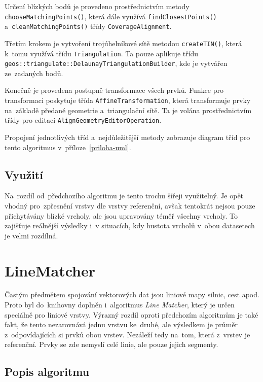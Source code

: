 Určení blízkých bodů je provedeno prostřednictvím metody 
\texttt{choose\-Matching\-Points()}, která dále využívá
\texttt{find\-Closest\-Points()} a~\texttt{clean\-Matching\-Points()} 
třídy \texttt{Coverage\-Alignment}.

Třetím krokem je vytvoření trojúhelníkové sítě metodou
\texttt{create\-TIN()}, která k~tomu využívá třídu 
\texttt{Tri\-an\-gu\-la\-tion}.  Ta pouze aplikuje třídu 
\texttt{geos::triangu\-late::Delaunay\-Triangulation\-Builder}, kde je 
vytvářen  ze~zadaných bodů.

Konečně je provedena postupně transformace všech prvků. Funkce pro
transformaci poskytuje třída \texttt{Affine\-Trans\-for\-mation},
která transformuje prvky na~základě předané geometrie a~triangulační
sítě. Ta je volána prostřednictvím třídy pro editaci 
\texttt{Align\-Geo\-metry\-Edi\-tor\-Ope\-ra\-tion}.

Propojení jednotlivých tříd a~nejdůležitější metody zobrazuje 
diagram tříd  pro tento algoritmus v~příloze~\ref{priloha-uml}.


\subsection{Využití}
\label{ca-vyuziti}

Na~rozdíl od~předchozího algoritmu je tento trochu šířeji využitelný. Je opět 
vhodný pro~zpřesnění vrstvy dle vrstvy referenční, avšak tentokrát nejsou 
pouze přichytá\-vány blízké vrcholy, ale jsou upravovány téměř všechny vrcholy. 
To zajišťuje reálnější výsledky i~v situacích, kdy hustota vrcholů v~obou 
datasetech je velmi rozdílná.


\section{LineMatcher}
\label{line matcher}

Častým předmětem spojování vektorových dat jsou liniové mapy silnic, cest apod.
Proto byl do~knihovny doplněn i~algoritmus \textit{Line Matcher}, který je
určen speciálně pro liniové vrstvy. Výrazný rozdíl oproti předchozím algoritmům
je také fakt, že tento nezarovnává jednu vrstvu ke~druhé, ale výsledkem je
průměr z~odpovídajících si prvků obou vrstev. Nezáleží tedy na~tom, která 
z~vrstev je referenční. Prvky se zde nemyslí celé linie, ale pouze jejich
segmenty.

\subsection{Popis algoritmu}
\label{lm-algoritmus}

